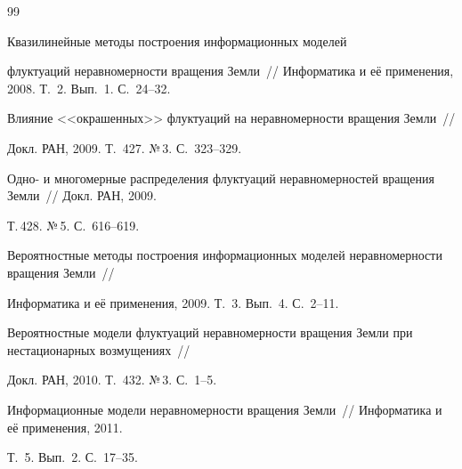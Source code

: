 {{\begin{thebibliography}{99}


 Квазилинейные методы построения информационных моделей 


флуктуаций неравномерности вращения Земли~/\!\!/ Информатика и её применения, 2008. Т.~2. Вып.~1. С.~24--32.









Влияние <<окрашенных>> флуктуаций на не\-рав\-но\-мер\-ности вращения Земли~/\!\!/ 


Докл. РАН, 2009. Т.~427. №\,3. С.~323--329.









Одно- и многомерные распределения флуктуаций неравномерностей вращения Земли~/\!\!/ Докл. РАН, 2009. 


Т.\,428. №\,5. С.~616--619.









Вероятностные методы построения информационных моделей неравномерности вращения Земли~/\!\!/ 


Информатика и её применения, 2009. Т.~3. Вып.~4. С.~2--11.









Вероятностные модели флуктуаций неравномерности вращения Земли при нестационарных возмущениях~/\!\!/ 


Докл. РАН, 2010. Т.~432. №\,3. С.~1--5.









Информационные модели неравномерности вращения Земли~/\!\!/ Информатика и её применения, 2011. 


Т.~5. Вып.~2. С.~17--35.






\end{thebibliography}}}
